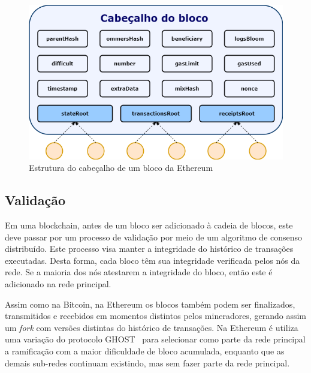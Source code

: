 \begin{figure}[htb]
 \caption{Estrutura do cabeçalho de um bloco da Ethereum}
 \label{fig:eth-block-header}
 \centering
 \includegraphics[scale=0.5]{figuras/eth_block_header.png}
\end{figure}


\subsection{Validação} \label{tex:fund:ethereum:valida}

Em uma blockchain, antes de um bloco ser adicionado à cadeia de blocos, este deve passar por um processo de validação por meio de um algoritmo de consenso distribuído. Este processo visa manter a integridade do histórico de transações executadas. Desta forma, cada bloco têm sua integridade verificada pelos nós da rede. Se a maioria dos nós atestarem a integridade do bloco, então este é adicionado na rede principal.

Assim como na Bitcoin, na Ethereum os blocos também podem ser finalizados, transmitidos e recebidos em momentos distintos pelos mineradores, gerando assim um \textit{fork} com versões distintas do histórico de transações. Na Ethereum é utiliza uma variação do protocolo GHOST~\cite{sompolinsky2015ghost-original} para selecionar como parte da rede principal a ramificação com a maior dificuldade de bloco acumulada, enquanto que as demais sub-redes continuam existindo, mas sem fazer parte da rede principal. 

